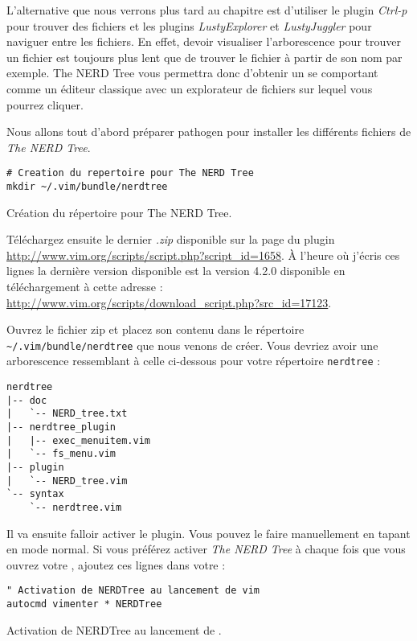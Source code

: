 L'alternative que nous verrons plus tard au chapitre \TODO est d'utiliser le plugin \emph{Ctrl-p} pour trouver des fichiers et les plugins \emph{LustyExplorer} et \emph{LustyJuggler} pour naviguer entre les fichiers. En effet, devoir visualiser l'arborescence pour trouver un fichier est toujours plus lent que de trouver le fichier à partir de son nom par exemple. The NERD Tree vous permettra donc d'obtenir un \vim se comportant comme un éditeur classique avec un explorateur de fichiers sur lequel vous pourrez cliquer.

Nous allons tout d'abord préparer pathogen pour installer les différents fichiers de \emph{The NERD Tree}.

\begin{listing}[H]
\begin{verbatim}
# Creation du repertoire pour The NERD Tree
mkdir ~/.vim/bundle/nerdtree
\end{verbatim}
  \caption{Création du répertoire pour The NERD Tree.}
  \label{code:nerdtree-bundle}
\end{listing}

Téléchargez ensuite le dernier \emph{.zip} disponible sur la page du plugin \url{http://www.vim.org/scripts/script.php?script_id=1658}. À l'heure où j'écris ces lignes la dernière version disponible est la version 4.2.0 disponible en téléchargement à cette adresse : \url{http://www.vim.org/scripts/download_script.php?src_id=17123}.

Ouvrez le fichier zip et placez son contenu dans le répertoire \Verb|~/.vim/bundle/nerdtree| que nous venons de créer. Vous devriez avoir une arborescence ressemblant à celle ci-dessous pour votre répertoire \Verb|nerdtree| :

\begin{verbatim}
nerdtree
|-- doc
|   `-- NERD_tree.txt
|-- nerdtree_plugin
|   |-- exec_menuitem.vim
|   `-- fs_menu.vim
|-- plugin
|   `-- NERD_tree.vim
`-- syntax
    `-- nerdtree.vim
\end{verbatim}

Il va ensuite falloir activer le plugin. Vous pouvez le faire manuellement en tapant  en mode normal. Si vous préférez activer \emph{The NERD Tree} à chaque fois que vous ouvrez votre \vim, ajoutez ces lignes dans votre \vimrc:

\begin{listing}[H]
\begin{verbatim}
" Activation de NERDTree au lancement de vim
autocmd vimenter * NERDTree
\end{verbatim}
\caption{Activation de NERDTree au lancement de \vim.}
\label{code:pathogen}
\end{listing}

